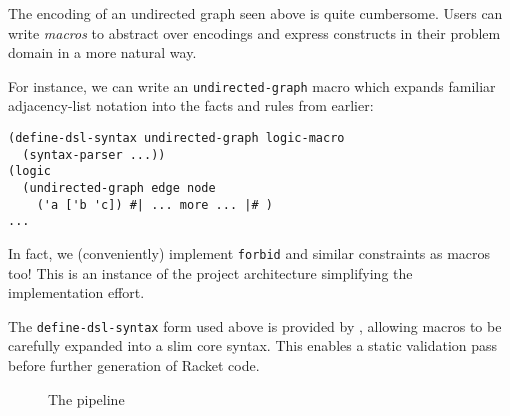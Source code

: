 \documentclass[dvipsnames,sigplan,screen,review,anonymous,acmthm,nonacm]{acmart}
\begin{document}
The encoding of an undirected graph seen above is quite cumbersome. Users can
write \emph{macros} to abstract over encodings and express constructs in their
problem domain in a more natural way.

For instance, we can write an \texttt{undirected-graph} macro
which expands familiar adjacency-list notation into the facts
and rules from earlier:

\begin{verbatim}
(define-dsl-syntax undirected-graph logic-macro
  (syntax-parser ...))
(logic
  (undirected-graph edge node
    ('a ['b 'c]) #| ... more ... |# )
...
\end{verbatim}

In fact, we (conveniently) implement \texttt{forbid} and similar constraints
as macros too!
This is an instance of the project architecture simplifying the implementation effort.

The \texttt{define-dsl-syntax} form used above is provided by \syntaxspec{},
allowing \miniDusa{} macros to be carefully expanded into a slim core syntax.
This enables a static validation pass before further generation of Racket code.

\begin{figure}[h]
  \begin{center}
  \end{center}
  \caption{The \miniDusa{} pipeline}
\end{figure}
\end{document}
